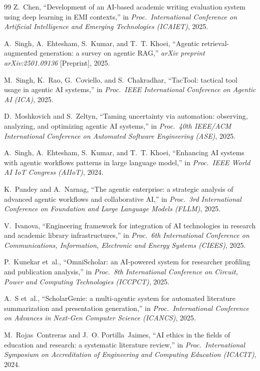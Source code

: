 \documentclass[sn-basic,Numbered]{sn-jnl}
\begin{document}
\begin{thebibliography}{99}
Z.~Chen,
``Development of an AI-based academic writing evaluation system using
deep learning in EMI contexts,''
in \emph{Proc.\ International Conference on Artificial Intelligence
and Emerging Technologies (ICAIET)}, 2025.

A.~Singh, A.~Ehtesham, S.~Kumar, and T.~T. Khoei,
``Agentic retrieval-augmented generation: a survey on agentic RAG,''
\emph{arXiv preprint arXiv:2501.09136} [Preprint], 2025.

M.~Singh, K.~Rao, G.~Coviello, and S.~Chakradhar,
``TacTool: tactical tool usage in agentic AI systems,''
in \emph{Proc.\ IEEE International Conference on Agentic AI (ICA)},
2025.

D.~Moshkovich and S.~Zeltyn,
``Taming uncertainty via automation: observing, analyzing, and
optimizing agentic AI systems,''
in \emph{Proc.\ 40th IEEE/ACM International Conference on Automated
Software Engineering (ASE)}, 2025.

A.~Singh, A.~Ehtesham, S.~Kumar, and T.~T. Khoei,
``Enhancing AI systems with agentic workflows patterns in large
language model,''
in \emph{Proc.\ IEEE World AI IoT Congress (AIIoT)}, 2024.

K.~Pandey and A.~Narnag,
``The agentic enterprise: a strategic analysis of advanced agentic
workflows and collaborative AI,''
in \emph{Proc.\ 3rd International Conference on Foundation and Large
Language Models (FLLM)}, 2025.

V.~Ivanova,
``Engineering framework for integration of AI technologies in research
and academic library infrastructures,''
in \emph{Proc.\ 6th International Conference on Communications,
Information, Electronic and Energy Systems (CIEES)}, 2025.

P.~Kunekar et~al.,
``OmniScholar: an AI-powered system for researcher profiling and
publication analysis,''
in \emph{Proc.\ 8th International Conference on Circuit, Power and
Computing Technologies (ICCPCT)}, 2025.

A.~S et~al.,
``ScholarGenie: a multi-agentic system for automated literature
summarization and presentation generation,''
in \emph{Proc.\ International Conference on Advances in Next-Gen
Computer Science (ICANCS)}, 2025.

M.~Rojas~Contreras and J.~O. Portilla~Jaimes,
``AI ethics in the fields of education and research: a systematic
literature review,''
in \emph{Proc.\ International Symposium on Accreditation of
Engineering and Computing Education (ICACIT)}, 2024.


\end{thebibliography}
\end{document}
